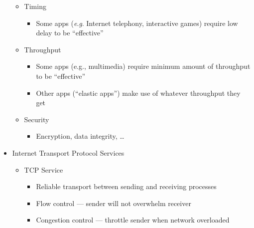 \begin{itemize}
\begin{itemize}
\begin{itemize}
        \end{itemize}

      \item Timing

        \begin{itemize}

          \item Some apps (\textit{e}.\textit{g}. Internet telephony, interactive games) require low delay to be ``effective''

        \end{itemize}

      \item Throughput

        \begin{itemize}

          \item Some apps (e.g., multimedia) require minimum amount of throughput to be ``effective''

          \item Other apps (``elastic apps'') make use of whatever throughput they get

        \end{itemize}

      \item Security

        \begin{itemize}

          \item Encryption, data integrity, \ldots

        \end{itemize}

    \end{itemize}

  \item Internet Transport Protocol Services

    \begin{itemize}

      \item TCP Service

        \begin{itemize}

          \item Reliable transport between sending and receiving processes

          \item Flow control — sender will not overwhelm receiver

          \item Congestion control — throttle sender when network overloaded


\end{itemize}
\end{itemize}
\end{itemize}
